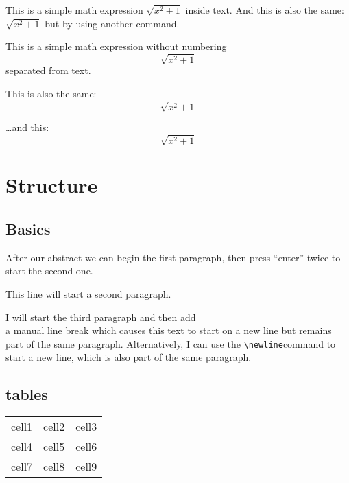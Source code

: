 \documentclass[12pt, letterpaper]{article}
\begin{document}
This is a simple math expression \(\sqrt{x^2+1}\) inside text. 
And this is also the same: 
\begin{math}
\sqrt{x^2+1}
\end{math}
but by using another command.

This is a simple math expression without numbering
\[\sqrt{x^2+1}\] 
separated from text.

This is also the same:
\begin{displaymath}
\sqrt{x^2+1}
\end{displaymath}

\ldots and this:
\begin{equation*}
\sqrt{x^2+1}
\end{equation*}

\section{Structure}
\subsection{Basics}

After our abstract we can begin the first paragraph, then press ``enter'' twice to start the second one.

This line will start a second paragraph.

I will start the third paragraph and then add \\ a manual line break which causes this text to start on a new line but remains part of the same paragraph. Alternatively, I can use the \verb|\newline|\newline command to start a new line, which is also part of the same paragraph.

\subsection{tables}

\begin{center}
\begin{tabular}{|c|c|c|} 
 \hline
 cell1 & cell2 & cell3 \\ 
 cell4 & cell5 & cell6 \\ 
 cell7 & cell8 & cell9 \\ 
 \hline
\end{tabular}
\end{center}
\end{document}
